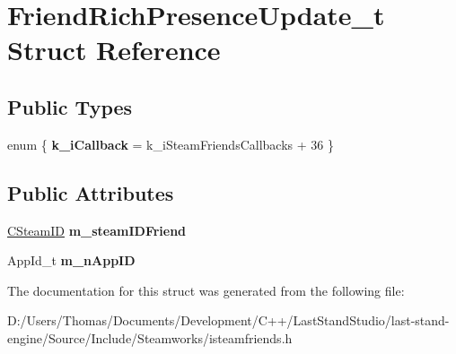 \hypertarget{structFriendRichPresenceUpdate__t}{}\section{Friend\+Rich\+Presence\+Update\+\_\+t Struct Reference}
\label{structFriendRichPresenceUpdate__t}
\subsection*{Public Types}
\begin{DoxyCompactItemize}
\item 
\hypertarget{structFriendRichPresenceUpdate__t_a90b86ef849578034417945a039ee15d6}{}enum \{ {\bfseries k\+\_\+i\+Callback} = k\+\_\+i\+Steam\+Friends\+Callbacks + 36
 \}\label{structFriendRichPresenceUpdate__t_a90b86ef849578034417945a039ee15d6}

\end{DoxyCompactItemize}
\subsection*{Public Attributes}
\begin{DoxyCompactItemize}
\item 
\hypertarget{structFriendRichPresenceUpdate__t_a0f7762ac8320ef3267facf379f6fd1f1}{}\hyperlink{classCSteamID}{C\+Steam\+I\+D} {\bfseries m\+\_\+steam\+I\+D\+Friend}\label{structFriendRichPresenceUpdate__t_a0f7762ac8320ef3267facf379f6fd1f1}

\item 
\hypertarget{structFriendRichPresenceUpdate__t_ade5a7282d7db117969972a3ec0510b5b}{}App\+Id\+\_\+t {\bfseries m\+\_\+n\+App\+I\+D}\label{structFriendRichPresenceUpdate__t_ade5a7282d7db117969972a3ec0510b5b}

\end{DoxyCompactItemize}


The documentation for this struct was generated from the following file\+:\begin{DoxyCompactItemize}
\item 
D\+:/\+Users/\+Thomas/\+Documents/\+Development/\+C++/\+Last\+Stand\+Studio/last-\/stand-\/engine/\+Source/\+Include/\+Steamworks/isteamfriends.\+h\end{DoxyCompactItemize}
